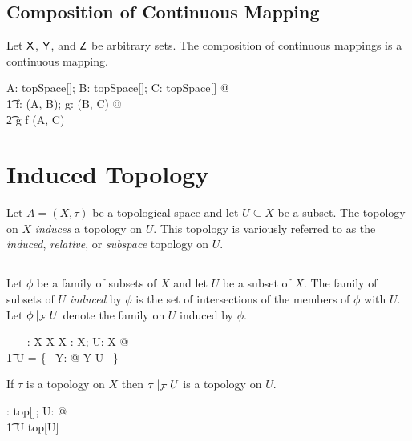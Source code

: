 \documentclass[11pt, oneside]{article}
\begin{document}
\subsection{Composition of Continuous Mapping}

\begin{remark}
Let $\mathsf{X}$, $\mathsf{Y}$, and $\mathsf{Z}$ be arbitrary sets.
The composition of continuous mappings is a continuous mapping.

\begin{zed}
	\forall A: topSpace[\setX]; B: topSpace[\setY]; C: topSpace[\setZ] @ \\
	\t1	\forall f: \CzeroTT(A, B); g: \CzeroTT(B, C) @ \\
	\t2		g \circ f \in \CzeroTT(A, C)
\end{zed}

\end{remark}

\section{Induced Topology}

Let $A = (X, \tau)$ be a topological space and let $U \subseteq X$ be a subset.
The topology on $X$ {\it induces} a topology on $U$.
This topology is variously referred to as the {\it induced}, {\it relative}, or {\it subspace} topology on $U$.

\subsection{}

Let $\phi$ be a family of subsets of $X$ and let $U$ be a subset of $X$.
The family of subsets of $U$ {\it induced} by $\phi$ is the set of intersections of the members of $\phi$ with $U$.
Let $\phi \mathbin{|_{\mathcal{F}}} U$ denote the family on $U$ induced by $\phi$.

\begin{gendef}[X]
	\_ \inducedFam \_:  \family X \cross \power X \fun \family X
\where
	\forall \phi: \family X; U: \power X @ \\
	\t1	\phi \inducedFam U = \{~ Y: \phi @ Y \cap U ~\}
\end{gendef}

\begin{remark}
If $\tau$ is a topology on $X$ then $\tau \mathbin{|_{\mathcal{F}}} U$ is a topology on $U$.

\begin{zed}
	\forall \tau: top[\setX]; U: \power \setX @ \\
	\t1	\tau \inducedFam U \in top[U]
\end{zed}

\end{remark}
\end{document}
